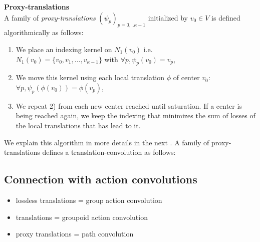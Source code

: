 \begin{definition}\textbf{Proxy-translations}\\
A family of \emph{proxy-translations} $(\psi_p)_{p=0,..\kappa-1}$ initialized by $v_0 \in V$ is defined algorithmically as follows:
\begin{enumerate}
\item We place an indexing kernel on $N_1(v_0) $ i.e.\\ $N_1(v_0) = \{v_0, v_1, ..., v_{\kappa-1}\}$ with $\forall p, \psi_p(v_0) = v_p$,
\item We move this kernel using each local translation $\phi$ of center $v_0$:\\ $\forall p, \psi_p(\phi(v_0)) = \phi(v_p)$,
\item We repeat 2) from each new center reached until saturation. If a center is being reached again, we keep the indexing that minimizes the sum of losses of the local translations that has lead to it.
\end{enumerate}
\end{definition}

We explain this algorithm in more details in the next . A family of proxy-translations defines a translation-convolution as follows:


\subsection{Connection with action convolutions}


\begin{itemize}[noitemsep,nolistsep]
  \item lossless translations = group action convolution
  \item translations = groupoid action convolution
  \item proxy translations = path convolution
\end{itemize}

